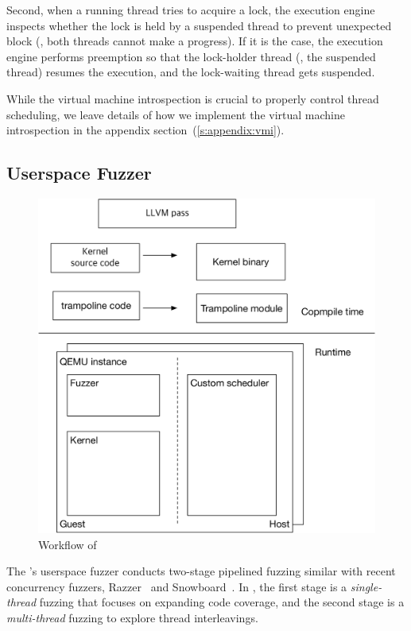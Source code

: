 Second, when a running thread tries to acquire a lock, the execution
engine inspects whether the lock is held by a suspended thread to
prevent unexpected block (\ie, both threads cannot make a progress).
%
If it is the case, the execution engine performs preemption so that
the lock-holder thread (\ie, the suspended thread) resumes the
execution, and the lock-waiting thread gets suspended.


While the virtual machine introspection is crucial to properly control
thread scheduling, we leave details of how we implement the virtual
machine introspection in the appendix
section~(\autoref{s:appendix:vmi}).



\subsection{Userspace Fuzzer}
\label{ss:fuzzer}



\begin{figure}
  \includegraphics[width=0.9\linewidth]{fig/architecture.pdf}
  \caption{Workflow of \sys {}}
  \label{fig:workflow}
\end{figure}


The \sys's userspace fuzzer conducts two-stage pipelined fuzzing
similar with recent concurrency fuzzers, Razzer~\cite{razzer} and
Snowboard~\cite{snowboard}.
%
In \sys, the first stage is a \textit{single-thread} fuzzing that
focuses on expanding code coverage, and the second stage is a
\textit{multi-thread} fuzzing to explore thread interleavings.

